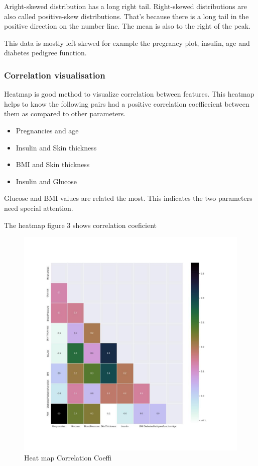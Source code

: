 \documentclass[
]{article}
\providecommand{\tightlist}{%
  \setlength{\itemsep}{0pt}\setlength{\parskip}{0pt}}
\begin{document}
Aright-skewed distribution has a long right tail. Right-skewed
distributions are also called positive-skew distributions. That's
because there is a long tail in the positive direction on the number
line. The mean is also to the right of the peak.

This data is mostly left skewed for example the pregrancy plot, insulin,
age and diabetes pedigree function.

\hypertarget{correlation-visualisation}{%
\subsubsection{Correlation
visualisation}\label{correlation-visualisation}}

Heatmap is good method to visualize correlation between features. This
heatmap helps to know the following pairs had a positive correlation
coeffiecient between them as compared to other parameters.

\begin{itemize}
\tightlist
\item
  Pregnancies and age
\item
  Insulin and Skin thickness
\item
  BMI and Skin thickness
\item
  Insulin and Glucose
\end{itemize}

Glucose and BMI values are related the most. This indicates the two
parameters need special attention.

The heatmap figure 3 shows correlation coeficient

\begin{figure}
\centering
\includegraphics{Corr.jpg}
\caption{Heat map Correlation Coeffi}
\end{figure}
\end{document}

